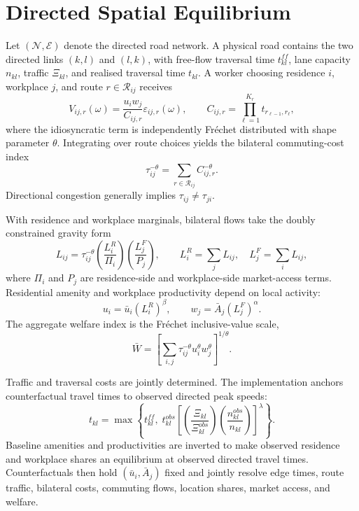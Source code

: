 \documentclass[12pt]{article}
\begin{document}
\section{Directed Spatial Equilibrium}

Let $(\mathcal{N},\mathcal{E})$ denote the directed road network. A physical road contains the two directed links $(k,l)$ and $(l,k)$, with free-flow traversal time $t_{kl}^{ff}$, lane capacity $n_{kl}$, traffic $\Xi_{kl}$, and realised traversal time $t_{kl}$. A worker choosing residence $i$, workplace $j$, and route $r\in\mathcal{R}_{ij}$ receives
\begin{equation}
  V_{ij,r}(\omega)=\frac{u_iw_j}{C_{ij,r}}\varepsilon_{ij,r}(\omega),
  \qquad
  C_{ij,r}=\prod_{\ell=1}^{K_r}t_{r_{\ell-1},r_\ell},
  \label{eq:utility}
\end{equation}
where the idiosyncratic term is independently Fr\'echet distributed with shape parameter $\theta$. Integrating over route choices yields the bilateral commuting-cost index
\begin{equation}
  \tau_{ij}^{-\theta}=\sum_{r\in\mathcal{R}_{ij}}C_{ij,r}^{-\theta}.
  \label{eq:tau}
\end{equation}
Directional congestion generally implies $\tau_{ij}\neq\tau_{ji}$.

With residence and workplace marginals, bilateral flows take the doubly constrained gravity form
\begin{equation}
  L_{ij}=\tau_{ij}^{-\theta}
  \left(\frac{L_i^R}{\Pi_i}\right)
  \left(\frac{L_j^F}{P_j}\right),
  \qquad
  L_i^R=\sum_jL_{ij},\quad L_j^F=\sum_iL_{ij},
  \label{eq:gravity}
\end{equation}
where $\Pi_i$ and $P_j$ are residence-side and workplace-side market-access terms. Residential amenity and workplace productivity depend on local activity:
\begin{equation}
  u_i=\bar u_i(L_i^R)^\beta,
  \qquad
  w_j=\bar A_j(L_j^F)^\alpha.
  \label{eq:fundamentals}
\end{equation}
The aggregate welfare index is the Fr\'echet inclusive-value scale,
\begin{equation}
  \bar W=\left[\sum_{i,j}\tau_{ij}^{-\theta}u_i^\theta w_j^\theta\right]^{1/\theta}.
  \label{eq:welfare}
\end{equation}

Traffic and traversal costs are jointly determined. The implementation anchors counterfactual travel times to observed directed peak speeds:
\begin{equation}
  t_{kl}=\max\!\left\{t_{kl}^{ff},\;
  t_{kl}^{obs}\left[
  \left(\frac{\Xi_{kl}}{\Xi_{kl}^{obs}}\right)
  \left(\frac{n_{kl}^{obs}}{n_{kl}}\right)
  \right]^\lambda\right\}.
  \label{eq:anchor}
\end{equation}
Baseline amenities and productivities are inverted to make observed residence and workplace shares an equilibrium at observed directed travel times. Counterfactuals then hold $(\bar u_i,\bar A_j)$ fixed and jointly resolve edge times, route traffic, bilateral costs, commuting flows, location shares, market access, and welfare.
\end{document}
